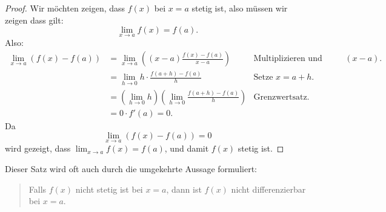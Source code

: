 \begin{proof}
Wir möchten zeigen, dass $f(x)$ bei $x=a$ stetig ist, also müssen wir zeigen dass gilt:
\[
\lim_{x\to a} f(x) = f(a).
\]
Also:
\begin{align*}
\lim_{x\to a} \left(f(x) - f(a)\right) &= \lim_{x\to a} \left((x-a)\frac{f(x) - f(a)}{x-a}\right) &\text{Multiplizieren und teilen durch $(x-a)$.} \\
&= \lim_{h\to 0} h \cdot \frac{f(a+h) - f(a)}{h} &\text{Setze $x = a+h$.} \\
&= \left(\lim_{h\to 0} h\right) \left(\lim_{h\to 0}\frac{f(a+h) - f(a)}{h}\right) &\text{Grenzwertsatz.} \\
&= 0\cdot f'(a) = 0.
\end{align*}
Da 
\[
\lim_{x\to a}\left(f(x) - f(a)\right) = 0 
\]
wird gezeigt, dass $\lim_{x\to a} f(x) = f(a)$, und damit $f(x)$ stetig ist.
\end{proof}

Dieser Satz wird oft auch durch die umgekehrte Aussage formuliert:
\begin{quote}
Falls $f(x)$ nicht stetig ist bei $x=a$, dann ist $f(x)$ nicht differenzierbar bei $x=a$.
\end{quote}





